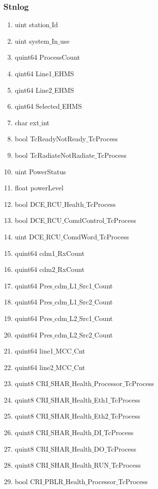 \begin{enumerate}
\subsubsection{Stnlog}
\begin{enumerate}
	\item uint station$\_$Id
	\item uint system$\_$In$\_$use
	\item quint64 ProcessCount
	\item qint64 Line1$\_$EHMS
	\item qint64 Line2$\_$EHMS
	\item qint64 Selected$\_$EHMS
	\item char ext$\_$int
	\item bool TcReadyNotReady$\_$TcProcess
	\item bool TcRadiateNotRadiate$\_$TcProcess
	\item uint PowerStatus
	\item float powerLevel
	\item bool DCE$\_$RCU$\_$Health$\_$TcProcess
	\item bool DCE$\_$RCU$\_$ComdControl$\_$TcProcess
	\item uint DCE$\_$RCU$\_$ComdWord$\_$TcProcess
	\item quint64 cdm1$\_$RxCount
	\item quint64 cdm2$\_$RxCount
	\item quint64 Pres$\_$cdm$\_$L1$\_$Src1$\_$Count
	\item quint64 Pres$\_$cdm$\_$L1$\_$Src2$\_$Count
	\item quint64 Pres$\_$cdm$\_$L2$\_$Src1$\_$Count
	\item quint64 Pres$\_$cdm$\_$L2$\_$Src2$\_$Count
	\item quint64 line1$\_$MCC$\_$Cnt
	\item quint64 line2$\_$MCC$\_$Cnt
	\item quint8 CRI$\_$SHAR$\_$Health$\_$Processor$\_$TcProcess
	\item quint8 CRI$\_$SHAR$\_$Health$\_$Eth1$\_$TcProcess
	\item quint8 CRI$\_$SHAR$\_$Health$\_$Eth2$\_$TcProcess
	\item quint8 CRI$\_$SHAR$\_$Health$\_$DI$\_$TcProcess
	\item quint8 CRI$\_$SHAR$\_$Health$\_$DO$\_$TcProcess
	\item quint8 CRI$\_$SHAR$\_$Health$\_$RUN$\_$TcProcess
	\item bool CRI$\_$PBLR$\_$Health$\_$Processor$\_$TcProcess

\end{enumerate}
\end{enumerate}

